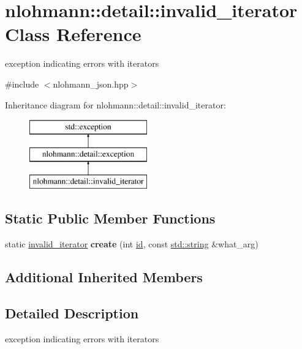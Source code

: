 \hypertarget{classnlohmann_1_1detail_1_1invalid__iterator}{}\section{nlohmann\+:\+:detail\+:\+:invalid\+\_\+iterator Class Reference}
\label{classnlohmann_1_1detail_1_1invalid__iterator}


exception indicating errors with iterators  




{\ttfamily \#include $<$nlohmann\+\_\+json.\+hpp$>$}

Inheritance diagram for nlohmann\+:\+:detail\+:\+:invalid\+\_\+iterator\+:\begin{figure}[H]
\begin{center}
\leavevmode
\includegraphics[height=3.000000cm]{d4/d5f/classnlohmann_1_1detail_1_1invalid__iterator}
\end{center}
\end{figure}
\subsection*{Static Public Member Functions}
\begin{DoxyCompactItemize}
\item 
\mbox{\label{classnlohmann_1_1detail_1_1invalid__iterator_a48d724eccc74b550d695fc7575d9ce30}} 
static \hyperlink{classnlohmann_1_1detail_1_1invalid__iterator}{invalid\+\_\+iterator} {\bfseries create} (int \hyperlink{classnlohmann_1_1detail_1_1exception_a0d4589a3fb54e81646d986c05efa3b9a}{id}, const \hyperlink{namespacenlohmann_1_1detail_a90aa5ef615aa8305e9ea20d8a947980fab45cffe084dd3d20d928bee85e7b0f21}{std\+::string} \&what\+\_\+arg)
\end{DoxyCompactItemize}
\subsection*{Additional Inherited Members}


\subsection{Detailed Description}
exception indicating errors with iterators 


